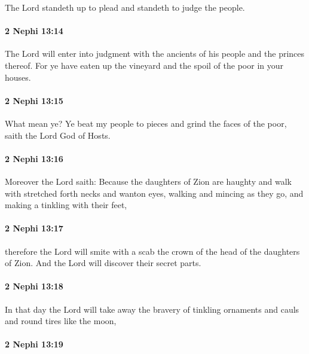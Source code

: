 			The Lord standeth up to plead and standeth to judge the people.

		\paragraph{2 Nephi 13:14} %
			\label{2NEPHI-13-14}

			The Lord will enter into judgment
			with the ancients of his people and the princes thereof.
			For ye have eaten up the vineyard and the spoil of the poor in your houses.

		\paragraph{2 Nephi 13:15} %
			\label{2NEPHI-13-15}

			What mean ye?
			Ye beat my people to pieces
			and grind the faces of the poor,
			saith the Lord God of Hosts.

		\paragraph{2 Nephi 13:16} %
			\label{2NEPHI-13-16}

			Moreover the Lord saith:
			Because the daughters of Zion are haughty
			and walk with stretched forth necks and wanton eyes,
			walking and mincing as they go,
			and making a tinkling with their feet,

		\paragraph{2 Nephi 13:17} %
			\label{2NEPHI-13-17}

			therefore the Lord will smite with a scab
			the crown of the head of the daughters of Zion.
			And the Lord will discover their secret parts.

		\paragraph{2 Nephi 13:18} %
			\label{2NEPHI-13-18}

			In that day the Lord will take away the bravery of tinkling ornaments
			and cauls and round tires like the moon,

		\paragraph{2 Nephi 13:19} %
			\label{2NEPHI-13-19}

